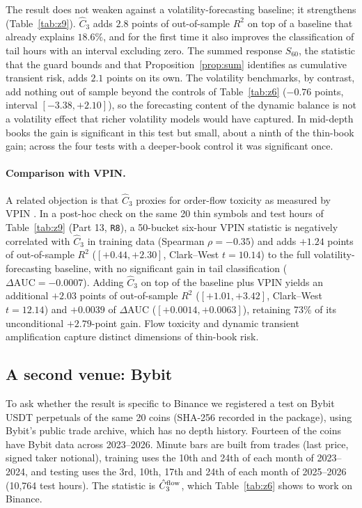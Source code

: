 \documentclass[12pt]{article}
\theoremstyle{definition}
\theoremstyle{remark}
\begin{document}
The result does not weaken against a volatility-forecasting baseline; it strengthens (Table~\ref{tab:z9}). $\hat C_3$ adds $2.8$ points of out-of-sample $R^2$ on top of a baseline that already explains $18.6\%$, and for the first time it also improves the classification of tail hours with an interval excluding zero. The summed response $S_{60}$, the statistic that the guard bounds and that Proposition~\ref{prop:sum} identifies as cumulative transient risk, adds $2.1$ points on its own. The volatility benchmarks, by contrast, add nothing out of sample beyond the controls of Table~\ref{tab:z6} ($-0.76$ points, interval $[-3.38,+2.10]$), so the forecasting content of the dynamic balance is not a volatility effect that richer volatility models would have captured. In mid-depth books the gain is significant in this test but small, about a ninth of the thin-book gain; across the four tests with a deeper-book control it was significant once.

\paragraph{Comparison with VPIN.} A related objection is that $\hat C_3$ proxies for order-flow toxicity as measured by VPIN \citep{easley2012}. In a post-hoc check on the same 20 thin symbols and test hours of Table~\ref{tab:z9} (Part 13, \texttt{R8}), a 50-bucket six-hour VPIN statistic is negatively correlated with $\hat C_3$ in training data (Spearman $\rho=-0.35$) and adds $+1.24$ points of out-of-sample $R^2$ ($[+0.44,+2.30]$, Clark--West $t=10.14$) to the full volatility-forecasting baseline, with no significant gain in tail classification ($\Delta\mathrm{AUC}=-0.0007$). Adding $\hat C_3$ on top of the baseline plus VPIN yields an additional $+2.03$ points of out-of-sample $R^2$ ($[+1.01,+3.42]$, Clark--West $t=12.14$) and $+0.0039$ of $\Delta\mathrm{AUC}$ ($[+0.0014,+0.0063]$), retaining 73\% of its unconditional $+2.79$-point gain. Flow toxicity and dynamic transient amplification capture distinct dimensions of thin-book risk.

\subsection{A second venue: Bybit}\label{sec:bybit}
To ask whether the result is specific to Binance we registered a test on Bybit USDT perpetuals of the same 20 coins (SHA-256 recorded in the package), using Bybit's public trade archive, which has no depth history. Fourteen of the coins have Bybit data across 2023--2026. Minute bars are built from trades (last price, signed taker notional), training uses the 10th and 24th of each month of 2023--2024, and testing uses the 3rd, 10th, 17th and 24th of each month of 2025--2026 (10{,}764 test hours). The statistic is $\hat C_3^{\rm flow}$, which Table~\ref{tab:z6} shows to work on Binance.
\end{document}
